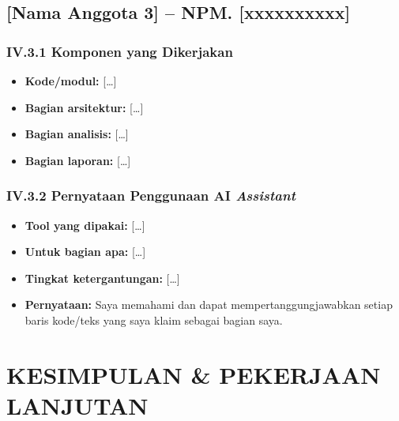 \documentclass[11pt,a4paper,oneside]{report}
\begin{document}
\section{[Nama Anggota 3] -- NPM. [xxxxxxxxxx]}

\subsection*{IV.3.1 Komponen yang Dikerjakan}
\begin{itemize}[leftmargin=*]
    \item \textbf{Kode/modul:} [\ldots]
    \item \textbf{Bagian arsitektur:} [\ldots]
    \item \textbf{Bagian analisis:} [\ldots]
    \item \textbf{Bagian laporan:} [\ldots]
\end{itemize}

\subsection*{IV.3.2 Pernyataan Penggunaan AI \textit{Assistant}}
\begin{itemize}[leftmargin=*]
    \item \textbf{Tool yang dipakai:} [\ldots]
    \item \textbf{Untuk bagian apa:} [\ldots]
    \item \textbf{Tingkat ketergantungan:} [\ldots]
    \item \textbf{Pernyataan:} Saya memahami dan dapat mempertanggungjawabkan setiap baris kode/teks yang saya klaim sebagai bagian saya.
\end{itemize}


\chapter{KESIMPULAN \& PEKERJAAN LANJUTAN}
\label{bab:kesimpulan}
\end{document}
